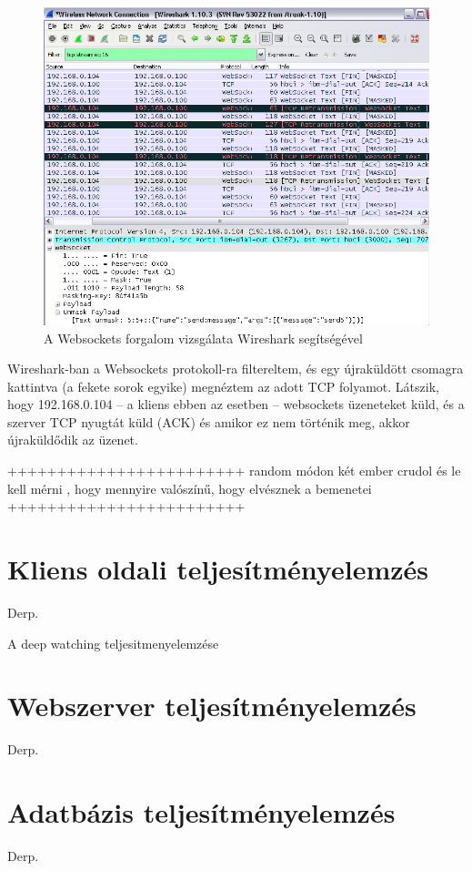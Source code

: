 \begin{figure}[!ht]
\centering
\includegraphics[width=15cm,keepaspectratio]{figures/wireshark.png}
\caption{A Websockets forgalom vizsgálata Wireshark segítségével}
\label{fig:wireshark}
\end{figure}


Wireshark-ban a Websockets protokoll-ra filtereltem, és egy újraküldött csomagra kattintva (a fekete sorok egyike) megnéztem az adott TCP folyamot. Látszik, hogy 192.168.0.104 -- a kliens ebben az esetben -- websockets üzeneteket küld, és a szerver TCP nyugtát küld (ACK) és amikor ez nem történik meg, akkor újraküldődik az üzenet.



++++++++++++++++++++++++
random módon két ember crudol és le kell mérni , hogy mennyire valószínű, hogy elvésznek a bemenetei
++++++++++++++++++++++++

\section{Kliens oldali teljesítményelemzés}
Derp.

A deep watching teljesitmenyelemzése

\section{Webszerver teljesítményelemzés}
Derp.

\section{Adatbázis teljesítményelemzés}
Derp.





